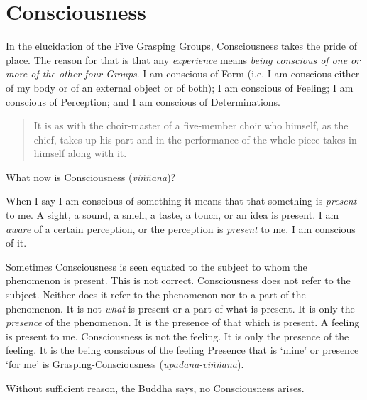 \chapter{Consciousness}

In the elucidation of the Five Grasping Groups, Consciousness takes the pride of place. The reason for that is that any \emph{experience} means \emph{being conscious of one or more of the other four Groups}. I am conscious of Form (i.e. I am conscious either of my body or of an external object or of both); I am conscious of Feeling; I am conscious of Perception; and I am conscious of Determinations.

\begin{quote}
It is as with the choir-master of a five-member choir who himself, as the chief, takes up his part and in the performance of the whole piece takes in himself along with it.
\end{quote}

What now is Consciousness (\textit{viññāna})?

When I say I am conscious of something it means that that something is \emph{present} to me. A sight, a sound, a smell, a taste, a touch, or an idea is present. I am \emph{aware} of a certain perception, or the perception is \emph{present} to me. I am conscious of it.

Sometimes Consciousness is seen equated to the subject to whom the phenomenon is present. This is not correct. Consciousness does not refer to the subject. Neither does it refer to the phenomenon nor to a part of the phenomenon. It is not \emph{what} is present or a part of what is present. It is only the \emph{presence} of the phenomenon. It is the presence of that which is present. A feeling is present to me. Consciousness is not the feeling. It is only the presence of the feeling. It is the being conscious of the feeling Presence that is `mine' or presence `for me' is Grasping-Consciousness (\textit{upādāna-viññāna}).

Without sufficient reason, the Buddha says, no Consciousness arises.


